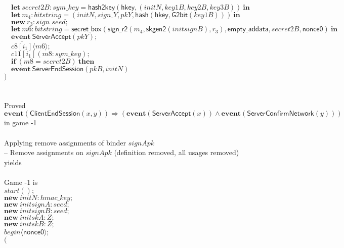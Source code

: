 \documentclass{article}
\newcommand{\cinput}[2]{{#1}({#2})}
\newcommand{\coutput}[2]{\overline{#1}\langle{#2}\rangle}
\newcommand{\kw}[1]{\mathbf{#1}}
\newcommand{\kwf}[1]{\mathsf{#1}}
\newcommand{\var}[1]{\mathit{#1}}
\newcommand{\kwt}[1]{\mathit{#1}}
\newcommand{\kwc}[1]{\mathit{#1}}
\begin{document}
\begin{tabbing}
\>$\quad \kw{let}\ \var{secret2B}: \kwt{sym{\_}key} = \kwf{hash2key}(\kwf{hkey}, \kwf{}(\var{initN}, \var{key1B}, \var{key2B}, \var{key3B}))\ \kw{in}$\\
\>$\quad \kw{let}\ \var{m}_{4}: \kwt{bitstring} = \kwf{}(\var{initN}, \var{sign{\_}Y}, \var{pkY}, \kwf{hash}(\kwf{hkey}, \kwf{G2bit}(\var{key1B})))\ \kw{in}$\\
\>$\quad \kw{new}\ \var{r}_{3}: \kwt{sign{\_}seed};$\\
\>$\quad \kw{let}\ \var{m6}: \kwt{bitstring} = \kwf{secret{\_}box}(\kwf{sign{\_}r2}(\var{m}_{4}, \kwf{skgen2}(\var{initsignB}), \var{r}_{3}), \kwf{empty{\_}addata}, \var{secret2B}, \kwf{nonce0})\ \kw{in}$\\
\>$\quad \kw{event}\ \kwf{ServerAccept}(\var{pkY});$\\
\>$\quad \coutput{\kwc{c8}[\var{i}_{1}]}{\var{m6}};$\\
\>$\quad \cinput{\kwc{c11}[\var{i}_{1}]}{\var{m8}: \kwt{sym{\_}key}};$\\
\>$\quad \kw{if}\ (\var{m8}  =  \var{secret2B})\ \kw{then}$\\
\>$\quad \kw{event}\ \kwf{ServerEndSession}(\var{pkB}, \var{initN})$\\
\>$)$\\
\\
\\
Proved $\kw{event}(\kwf{ClientEndSession}(\var{x}, \var{y})) \Longrightarrow (\kw{event}(\kwf{ServerAccept}(\var{x})) \wedge \kw{event}(\kwf{ServerConfirmNetwork}(\var{y})))$ in game -1\\
\\
Applying remove assignments of binder $\var{signApk}$\\
\quad -- Remove assignments on $\var{signApk}$ (definition removed, all usages removed)\\
yields\\
\\
Game -1 is\\
\>$\cinput{\kwc{start}}{};$\\
\>$\kw{new}\ \var{initN}: \kwt{hmac{\_}key};$\\
\>$\kw{new}\ \var{initsignA}: \kwt{seed};$\\
\>$\kw{new}\ \var{initsignB}: \kwt{seed};$\\
\>$\kw{new}\ \var{initskA}: \kwt{Z};$\\
\>$\kw{new}\ \var{initskB}: \kwt{Z};$\\
\>$\coutput{\kwc{begin}}{\kwf{nonce0}};$\\
\>$($\\

\end{tabbing}
\end{document}
